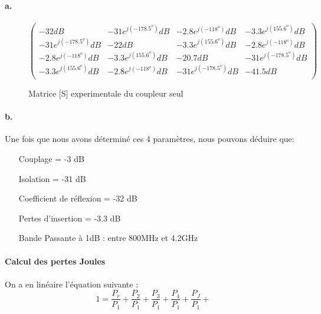 \documentclass[oneside,a4paper,12pt]{article}
\begin{document}
	\paragraph{a.}\paragraph{}
	\begin{figure}[h]
		\centering
		$
		\begin{pmatrix}
			-32 dB & -31 e^{j(-178.5^{o})} dB & -2.8 e^{j(-118^{o})} dB & -3.3 e^{j(155.6^{o})} dB \\
			-31 e^{j(-178.5^{o})} dB & -22 dB & -3.3 e^{j(155.6^{o})} dB & -2.8 e^{j(-118^{o})} dB \\
			-2.8 e^{j(-118^{o})} dB & -3.3 e^{j(155.6^{o})} dB & -20.7 dB & -31 e^{j(-178.5^{o})} dB \\
			-3.3 e^{j(155.6^{o})} dB & -2.8 e^{j(-118^{o})} dB & -31 e^{j(-178.5^{o})} dB & -41.5 dB \\
		\end{pmatrix}
		$
		\caption{Matrice [S] experimentale du coupleur seul}
	\end{figure}

	\paragraph{b.}
	Une fois que nous avons déterminé ces 4 paramètres, nous pouvons déduire que:

	\begin{itemize}
		\item[Couplage] = -3 dB
		\item[Isolation] = -31 dB 
		\item[Coefficient de réflexion] = -32 dB
		\item[Pertes d'insertion] = -3.3 dB  
		\item[Bande Passante à 1dB] : entre 800MHz et 4.2GHz 
	\end{itemize}
	
	\paragraph{Calcul des pertes Joules}
	\paragraph{}
	On a en linéaire l'équation suivante : 
	\[ 1 = \frac{P_{r}}{P_{1}} + \frac{P_{2}}{P_{1}} + \frac{P_{3}}{P_{1}} + \frac{P_{4}}{P_{1}} + \frac{P_{J}}{P_{1}} + \]
\end{document}
